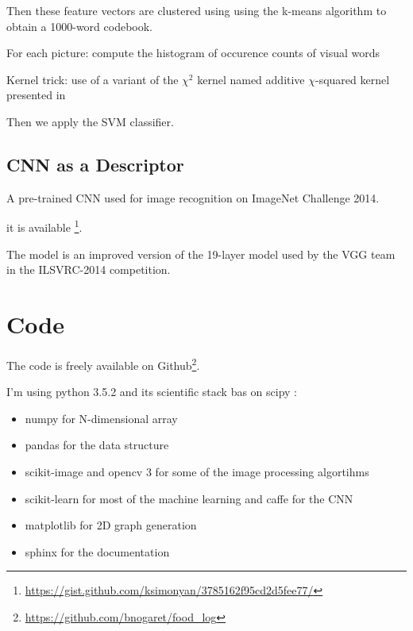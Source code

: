 Then these feature vectors are clustered using using the k-means algorithm to obtain a 1000-word codebook.

For each picture:
compute the histogram of occurence counts of visual words

Kernel trick: use of a variant of the $\chi^2$ kernel named additive $\chi$-squared kernel presented in \cite{Vedaldi2010}

Then we apply the SVM classifier.

\subsection{CNN as a Descriptor}

A pre-trained CNN used for image recognition on ImageNet Challenge 2014.

\cite{Simonyan2014}

it is available \footnote{\url{https://gist.github.com/ksimonyan/3785162f95cd2d5fee77/}}.

The model is an improved version of the 19-layer model used by the VGG team in the ILSVRC-2014 competition.

\section{Code}

The code is freely available on Github\footnote{\url{https://github.com/bnogaret/food_log}}.

I'm using python 3.5.2 and its scientific stack bas on scipy \cite{Oliphant2007}:
\begin{itemize}
    \item numpy \cite{VanDerWalt2011} for N-dimensional array
    \item pandas \cite{McKinney2010} for the data structure
    \item scikit-image \cite{VanderWalt2014} and opencv 3 \cite{Bradski2000} for some of the image processing algortihms
    \item scikit-learn \cite{Pedregosa2012} for most of the machine learning and caffe \cite{Jia2014a}  for the CNN
    \item matplotlib \cite{Hunter2007} for 2D graph generation
    \item sphinx for the documentation
\end{itemize}
